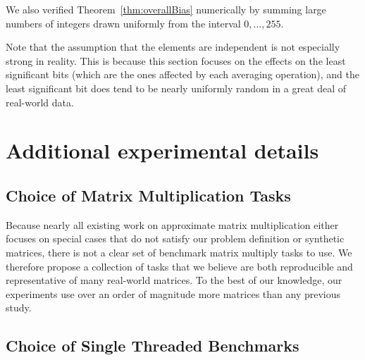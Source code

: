 We also verified Theorem~\ref{thm:overallBias} numerically by summing large numbers of integers drawn uniformly from the interval $0,\ldots,255$.

Note that the assumption that the elements are independent is not especially strong in reality. This is because this section focuses on the effects on the least significant bits (which are the ones affected by each averaging operation), and the least significant bit does tend to be nearly uniformly random in a great deal of real-world data.

\vfill\break  %
\section{Additional experimental details} \label{sec:experimentDetails}

\subsection{Choice of Matrix Multiplication Tasks}

Because nearly all existing work on approximate matrix multiplication either focuses on special cases that do not satisfy our problem definition \cite{quickerAdc, pq, opq} or synthetic matrices, there is not a clear set of benchmark matrix multiply tasks to use. We therefore propose a collection of tasks that we believe are both reproducible and representative of many real-world matrices. To the best of our knowledge, our experiments use over an order of magnitude more matrices than any previous study.

\subsection{Choice of Single Threaded Benchmarks} \label{appendix:onethread}


